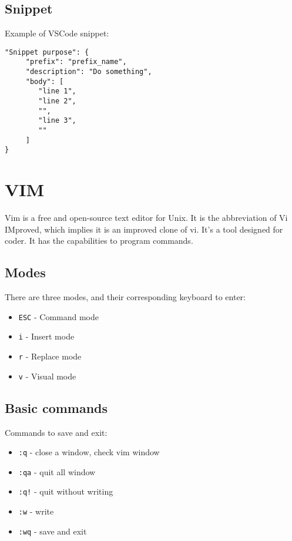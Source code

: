 \subsection{Snippet}

Example of VSCode snippet:
\begin{verbatim}
"Snippet purpose": {
	 "prefix": "prefix_name",
	 "description": "Do something",
	 "body": [
	    "line 1",
	    "line 2",
	    "",
	    "line 3",
	    ""
	 ]
}
\end{verbatim}

\section{VIM}

Vim \cite{vim} is a free and open-source text editor for Unix. It is the abbreviation of Vi IMproved, which implies it is an improved clone of vi. It's a tool designed for coder. It has the capabilities to program commands.

\subsection{Modes}

There are three modes, and their corresponding keyboard to enter:

\begin{itemize}
	\setlength\itemsep{0em}
	\item \verb|ESC| - Command mode
	\item \verb|i| - Insert mode
	\item \verb|r| - Replace mode
	\item \verb|v| - Visual mode
\end{itemize}

\subsection{Basic commands}

Commands to save and exit:
\begin{itemize}
	\setlength\itemsep{0em}
	\item \verb|:q| - close a window, check vim window
	\item \verb|:qa| - quit all window
	\item \verb|:q!| - quit without writing
	\item \verb|:w| - write
	\item \verb|:wq| - save and exit
\end{itemize}

